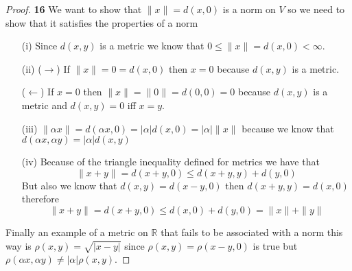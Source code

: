 \documentclass[11pt]{article}
\newcommand{\R}{\mathbb{R}}
\theoremstyle{definition}
\begin{document}
\cleardoublepage
	\begin{proof}{\textbf{16}}
        We want to show that $\|x\| = d(x,0)$ is a norm on $V$ so we need to show that
        it satisfies the properties of a norm
        \begin{itemize}
            \item [(i)] Since $d(x,y)$ is a metric we know that
            $0 \leq \|x\| = d(x,0) < \infty$.
            \item [(ii)] ($\rightarrow$) If $\|x\| = 0 = d(x,0)$ then $x = 0$ because
            $d(x,y)$ is a metric.
            
            ($\leftarrow$) If $x=0$ then $\|x\| = \|0\| = d(0, 0) = 0$ because
            $d(x,y)$ is a metric and $d(x,y) = 0$ iff $x=y$.
            \item [(iii)] $\|\alpha x\| = d(\alpha x, 0) = |\alpha|d(x,0) = |\alpha|\|x\|$
            because we know that $d(\alpha x, \alpha y) = |\alpha| d(x,y)$
            \item [(iv)] Because of the triangle inequality defined for metrics we have
            that 
            $$\|x+y\| = d(x+y,0) \leq d(x+y,y) + d(y,0)$$
            But also we know that $d(x,y) = d(x-y,0)$ then $d(x+y,y) = d(x,0)$ therefore
            $$\|x+y\| = d(x+y,0) \leq d(x,0) + d(y,0) = \|x\| + \|y\|$$
        \end{itemize}
        Finally an example of a metric on $\R$ that fails to be associated with a norm
        this way is $\rho(x,y) = \sqrt{|x-y|}$ since $\rho(x,y) = \rho(x-y,0)$ is true
        but $\rho(\alpha x,\alpha y) \neq |\alpha|\rho(x,y)$.
    \end{proof} 
\end{document}
